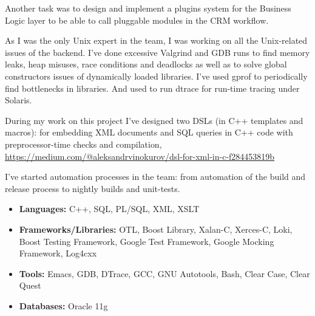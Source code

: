 Another task was to design and implement a plugins system for the
Business Logic layer to be able to call pluggable modules in the CRM
workflow.

As I was the only Unix expert in the team, I was working on all the
Unix-related issues of the backend. I've done excessive Valgrind and
GDB runs to find memory leaks, heap misuses, race conditions and
deadlocks as well as to solve global constructors issues of
dynamically loaded libraries.  I've used gprof to periodically find
bottlenecks in libraries. And used to run dtrace for run-time tracing
under Solaris.

During my work on this project I've designed two DSLs (in C++
templates and macros): for embedding XML documents and SQL queries in
C++ code with preprocessor-time checks and compilation,
\href{https://medium.com/@aleksandrvinokurov/dsl-for-xml-in-c-f284453819b}{\url{https://medium.com/@aleksandrvinokurov/dsl-for-xml-in-c-f284453819b}}

I've started automation processes in the team: from automation of the
build and release process to nightly builds and unit-tests.

\begin{itemize}[noitemsep, nosep]
  \item \textbf{Languages:} C++, SQL, PL/SQL, XML, XSLT
  \item \textbf{Frameworks/Libraries:} OTL, Boost Library, Xalan-C,
Xerces-C, Loki, Boost Testing Framework, Google Test Framework, Google
Mocking Framework, Log4cxx
  \item \textbf{Tools:} Emacs, GDB, DTrace, GCC, GNU Autotools, Bash,
Clear Case, Clear Quest
  \item \textbf{Databases:} Oracle 11g
\end{itemize}
